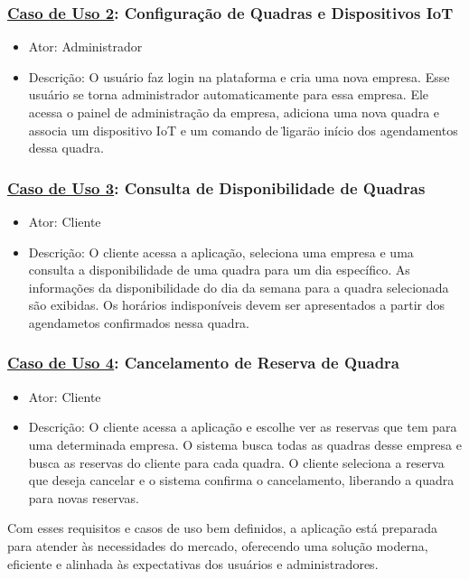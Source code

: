 \subsubsection*{\underline{Caso de Uso 2}: Configuração de Quadras e Dispositivos IoT}
\begin{itemize}
     \item Ator: Administrador
     \item Descrição: O usuário faz login na plataforma e cria uma nova empresa. Esse usuário se torna administrador automaticamente para essa empresa. Ele acessa o painel de administração da empresa, adiciona uma nova quadra e associa um dispositivo IoT e um comando de \"ligar\" ao início dos agendamentos dessa quadra.
\end{itemize}

\subsubsection*{\underline{Caso de Uso 3}: Consulta de Disponibilidade de Quadras}
\begin{itemize}
     \item Ator: Cliente
     \item Descrição: O cliente acessa a aplicação, seleciona uma empresa e uma consulta a disponibilidade de uma quadra para um dia específico. As informações da disponibilidade do dia da semana para a quadra selecionada são exibidas. Os horários indisponíveis devem ser apresentados a partir dos agendametos confirmados nessa quadra.
\end{itemize}

\subsubsection*{\underline{Caso de Uso 4}: Cancelamento de Reserva de Quadra}
\begin{itemize}
     \item Ator: Cliente
     \item Descrição: O cliente acessa a aplicação e escolhe ver as reservas que tem para uma determinada empresa. O sistema busca todas as quadras desse empresa e busca as reservas do cliente para cada quadra. O cliente seleciona a reserva que deseja cancelar e o sistema confirma o cancelamento, liberando a quadra para novas reservas.
\end{itemize}

Com esses requisitos e casos de uso bem definidos, a aplicação está preparada para atender às necessidades do mercado, oferecendo uma solução moderna, eficiente e alinhada às expectativas dos usuários e administradores.